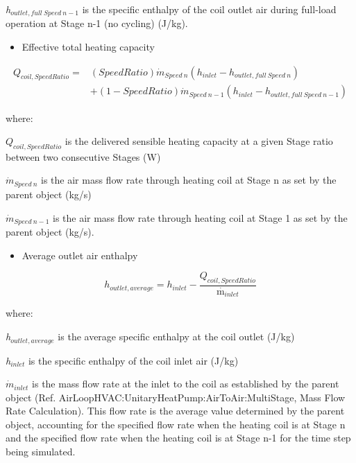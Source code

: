 \emph{h\(_{outlet,full~Speed~n-1}\)} is the specific enthalpy of the coil outlet air during full-load operation at Stage n-1 (no cycling) (J/kg).

\begin{itemize}
  \item Effective total heating capacity
\end{itemize}

\begin{equation}
  \begin{array}{rl}
    Q_{coil,SpeedRatio} =& \left( SpeedRatio \right){\dot{m}_{Speed~n}}(h_{inlet} - h_{outlet,full~Speed~n}) \\
                         &+ (1 - SpeedRatio) {\dot{m}_{Speed~n-1}}(h_{inlet} - h_{outlet,full~Speed~n-1})
  \end{array}
\end{equation}

where:

\({{Q_{coil,SpeedRatio}}}\) is the delivered sensible heating capacity at a given Stage ratio between two consecutive Stages (W)

\(\dot{m}_{Speed~n}\) is the air mass flow rate through heating coil at Stage n as set by the parent object (kg/s)

\(\dot{m}_{Speed~n-1}\) is the air mass flow rate through heating coil at Stage 1 as set by the parent object (kg/s).

\begin{itemize}
  \item Average outlet air enthalpy
\end{itemize}

\begin{equation}
  h_{outlet,average} = h_{inlet} - \frac{Q_{coil,SpeedRatio}}{{\mathop m\limits^\cdot }_{inlet}}
\end{equation}

where:

\emph{h\(_{outlet,average}\)} is the average specific enthalpy at the coil outlet (J/kg)

\emph{h\(_{inlet}\)} is the specific enthalpy of the coil inlet air (J/kg)

\({\dot m_{inlet}}\) is the mass flow rate at the inlet to the coil as established by the parent object (Ref. AirLoopHVAC:UnitaryHeatPump:AirToAir:MultiStage, Mass Flow Rate Calculation). This flow rate is the average value determined by the parent object, accounting for the specified flow rate when the heating coil is at Stage n and the specified flow rate when the heating coil is at Stage n-1 for the time step being simulated.


